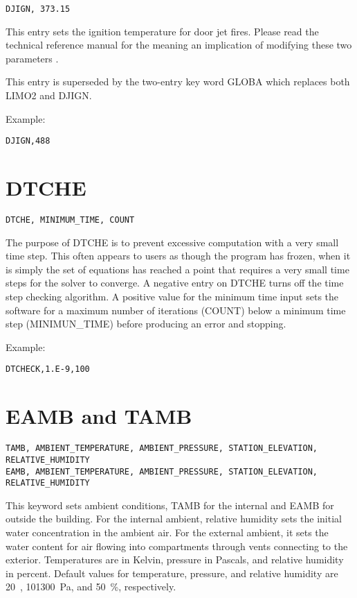 \begin{lstlisting}
DJIGN, 373.15
\end{lstlisting}
This entry sets the ignition temperature for door jet fires. Please read the technical reference manual for the meaning an implication of modifying these two parameters \cite{CFAST_Tech_Guide_6}.

This entry is superseded by the two-entry key word GLOBA which replaces both LIMO2 and DJIGN.

Example:

\begin{lstlisting}
DJIGN,488
\end{lstlisting}

\section{DTCHE}

\begin{lstlisting}
DTCHE, MINIMUM_TIME, COUNT
\end{lstlisting}
The purpose of DTCHE is to prevent excessive computation with a very small time step. This often appears to users as though the program has frozen, when it is simply the set of equations has reached a point that requires a very small time steps for the solver to converge. A negative entry on DTCHE turns off the time step checking algorithm. A positive value for the minimum time input sets the software for a maximum number of iterations (COUNT) below a minimum time step (MINIMUN\_TIME) before producing an error and stopping.

Example:

\begin{lstlisting}
DTCHECK,1.E-9,100
\end{lstlisting}

\section{EAMB and TAMB}

\begin{lstlisting}
TAMB, AMBIENT_TEMPERATURE, AMBIENT_PRESSURE, STATION_ELEVATION, RELATIVE_HUMIDITY
EAMB, AMBIENT_TEMPERATURE, AMBIENT_PRESSURE, STATION_ELEVATION, RELATIVE_HUMIDITY
\end{lstlisting}

This keyword sets ambient conditions, TAMB for the internal and EAMB for outside the building. For the internal ambient, relative humidity sets the initial water concentration in the ambient air.  For the external ambient, it sets the water content for air flowing into compartments through vents connecting to the exterior. Temperatures are in Kelvin, pressure in Pascals, and relative humidity in percent. Default values for temperature, pressure, and relative humidity are 20~\degc, 101300~Pa, and 50~\%, respectively.

